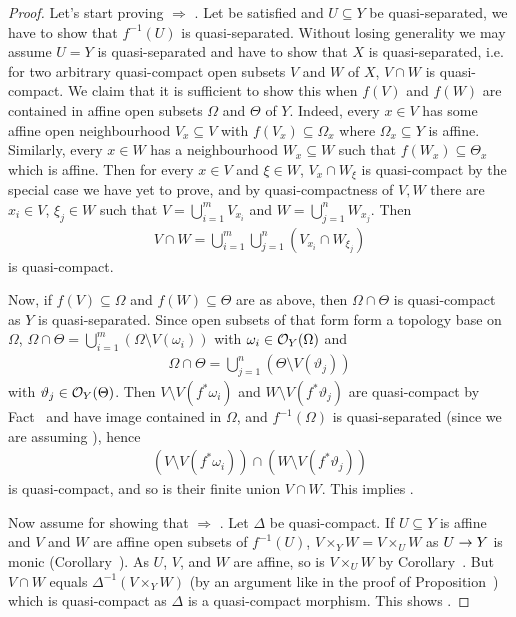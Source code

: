 \documentclass[a4paper,parskip=half,numbers=enddot, DIV=12]{scrreprt}
\begin{document}
\begin{proof}
    Let's start proving  $\Rightarrow$ . Let  be satisfied and $U\subseteq Y$ be quasi-separated, we have to show that $f^{-1}(U)$ is quasi-separated. Without losing generality we may assume $U=Y$ is quasi-separated and have to show that $X$ is quasi-separated, i.e. for two arbitrary quasi-compact open subsets $V$ and $W$ of $X$, $V\cap W$ is quasi-compact. We claim that it is sufficient to show this when $f(V)$ and $f(W)$ are contained in affine open subsets $\Omega$ and $\Theta$ of $Y$. Indeed, every $x\in V$ has some affine open neighbourhood $V_x\subseteq V$ with $f(V_x)\subseteq \Omega_x$ where $\Omega_x \subseteq Y$ is affine. Similarly, every $x\in W$ has a neighbourhood $W_x\subseteq W$ such that $f(W_x)\subseteq \Theta_x$ which is affine. Then for every $x\in V$ and $\xi \in W$, $V_x\cap W_\xi$ is quasi-compact by the special case we have yet to prove, and by quasi-compactness of $V,W$ there are $x_i\in V$, $\xi_j\in W$ such that $V=\bigcup_{i=1}^m V_{x_i}$ and $W = \bigcup_{j=1}^n W_{x_j}$. Then
    \begin{align*}
        V\cap W = \bigcup_{i=1}^m \bigcup_{j=1}^n (V_{x_i}\cap W_{\xi_j})
    \end{align*}
    is quasi-compact.
    
    Now, if $f(V)\subseteq \Omega$ and $f(W)\subseteq \Theta$ are as above, then $\Omega\cap \Theta$ is quasi-compact as $Y$ is quasi-separated. Since open subsets of that form form a topology base on $\Omega$, $\Omega\cap \Theta = \bigcup_{i=1}^m (\Omega\setminus V(\omega_i))$ with $\omega_i\in \mathcal{O}_Y(\Omega)$ and 
    \begin{align*}
        \Omega\cap \Theta = \bigcup_{j=1}^n(\Theta \setminus V(\vartheta_j))
    \end{align*}
    with $\vartheta_j\in \mathcal{O}_Y(\Theta)$. Then $V\setminus V(f^*\omega_i)$ and $W\setminus V(f^* \vartheta_j)$ are quasi-compact by Fact~ and have image contained in $\Omega$, and $f^{-1}(\Omega)$ is quasi-separated (since we are assuming ), hence
    \begin{align*}
        (V\setminus V(f^*\omega_i))\cap (W\setminus V(f^* \vartheta_j))
    \end{align*}
    is quasi-compact, and so is their finite union $V\cap W$. This implies .
    
    Now assume  for showing that  $\Rightarrow$ . Let $\Delta$ be quasi-compact. If $U\subseteq Y$ is affine and $V$ and $W$ are affine open subsets of $f^{-1}(U)$, $V\times_Y W = V\times_U W$ as $U\morphism Y$ is monic (Corollary~). As $U$, $V$, and $W$ are affine, so is $V\times_U W$ by Corollary~. But $V\cap W$ equals $\Delta^{-1}(V\times_Y W)$ (by an argument like in the proof of Proposition~) which is quasi-compact as $\Delta$ is a quasi-compact morphism. This shows .
    

\end{proof}
\end{document}
